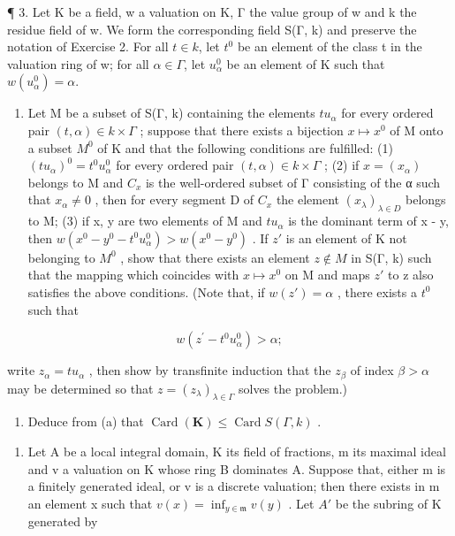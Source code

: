 ¶ 3. Let K be a field, w a valuation on K, Γ the value group of w and k the residue field of w. We form the corresponding field S(Γ, k) and preserve the notation of Exercise 2. For all \(t \in k\), let \(t^{0}\) be an element of the class t in the valuation ring of w; for all \(\alpha \in \Gamma\), let \(u_{\alpha}^{0}\) be an element of K such that \(w(u_{\alpha}^{0}) = \alpha\).

\begin{enumerate}
\def\labelenumi{(\alph{enumi})}
\tightlist
\item
  Let M be a subset of S(Γ, k) containing the elements \(tu_{\alpha}\) for every ordered pair \((t, \alpha) \in k \times \Gamma\) ; suppose that there exists a bijection \(x \mapsto x^{0}\) of M onto a subset \(M^{0}\) of K and that the following conditions are fulfilled: (1) \((tu_{\alpha})^{0} = t^{0}u_{\alpha}^{0}\) for every ordered pair \((t, \alpha) \in k \times \Gamma\) ; (2) if \(x = (x_{\alpha})\) belongs to M and \(C_{x}\) is the well-ordered subset of Γ consisting of the α such that \(x_{\alpha} \neq 0\) , then for every segment D of \(C_{x}\) the element \((x_{\lambda})_{\lambda \in D}\) belongs to M; (3) if x, y are two elements of M and \(tu_{\alpha}\) is the dominant term of x - y, then \(w(x^{0} - y^{0} - t^{0}u_{\alpha}^{0}) > w(x^{0} - y^{0})\) . If \(z'\) is an element of K not belonging to \(M^{0}\) , show that there exists an element \(z \notin M\) in S(Γ, k) such that the mapping which coincides with \(x \mapsto x^{0}\) on M and maps \(z'\) to z also satisfies the above conditions. (Note that, if \(w(z') = \alpha\) , there exists a \(t^{0}\) such that
\end{enumerate}

\[
w (z ^ {\prime} - t ^ {0} u _ {\alpha} ^ {0}) > \alpha ;
\]

write \(z_{\alpha} = tu_{\alpha}\) , then show by transfinite induction that the \(z_{\beta}\) of index \(\beta > \alpha\) may be determined so that \(z = (z_{\lambda})_{\lambda \in \Gamma}\) solves the problem.)

\begin{enumerate}
\def\labelenumi{(\alph{enumi})}
\setcounter{enumi}{1}
\tightlist
\item
  Deduce from (a) that \(\operatorname{Card}(\mathbf{K}) \leqslant \operatorname{Card} S(\Gamma, k)\) .
\end{enumerate}

\begin{enumerate}
\def\labelenumi{\arabic{enumi}.}
\setcounter{enumi}{3}
\tightlist
\item
  Let A be a local integral domain, K its field of fractions, m its maximal ideal and v a valuation on K whose ring B dominates A. Suppose that, either m is a finitely generated ideal, or v is a discrete valuation; then there exists in m an element x such that \(v(x) = \inf_{y \in \mathfrak{m}} v(y)\) . Let \(A'\) be the subring of K generated by
\end{enumerate}

